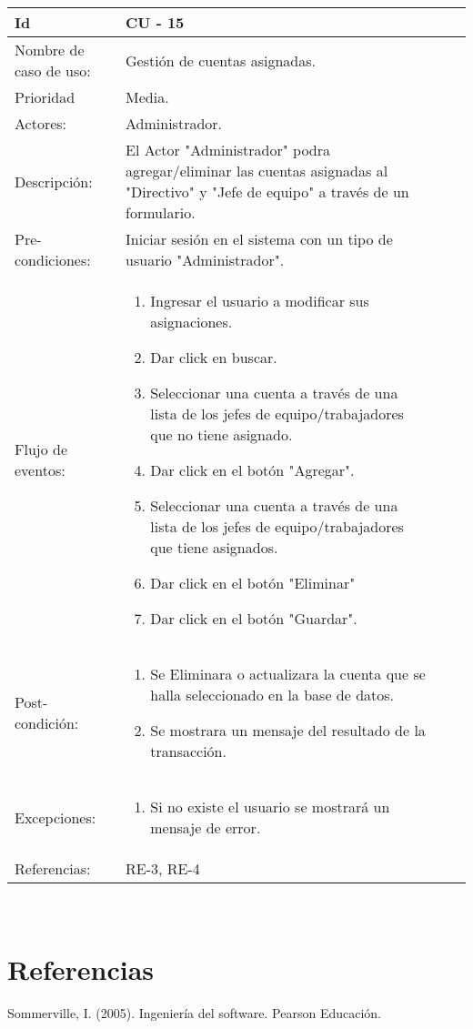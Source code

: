 \documentclass[11pt,a4paper]{article}
\begin{document}
\begin{tabular}[c]{|p{3cm}|p{13cm}|p{2.5cm}|p{3cm}|}
\hline 
\rule[-1ex]{0pt}{2.5ex} Id & CU - 15 \\ 
\hline 
\rule[-1ex]{0pt}{2.5ex} Nombre de caso de uso: & Gestión de cuentas asignadas.\\ 
\hline 
\rule[-1ex]{0pt}{2.5ex} Prioridad & Media. \\ 
\hline 
\rule[-1ex]{0pt}{2.5ex} Actores: & Administrador. \\ 
\hline 
\rule[-1ex]{0pt}{2.5ex} Descripción: & El Actor "Administrador" podra agregar/eliminar las cuentas asignadas al "Directivo" y "Jefe de equipo" a través de un formulario. \\ 
\hline 
\rule[-1ex]{0pt}{2.5ex} Pre-condiciones: & Iniciar sesión en el sistema con un tipo de usuario "Administrador". \\ 
\hline 
\rule[-1ex]{0pt}{2.5ex} Flujo de eventos: & \begin{enumerate}
\item Ingresar el usuario a modificar sus asignaciones.
\item Dar click en buscar.
\item Seleccionar una cuenta a través de una lista de los jefes de equipo/trabajadores que no tiene asignado.
\item Dar click en el botón "Agregar".
\item Seleccionar una cuenta a través de una lista de los jefes de equipo/trabajadores que tiene asignados.
\item Dar click en el botón "Eliminar"
\item Dar click en el botón "Guardar".
\end{enumerate} \\ 
\hline 
\rule[-1ex]{0pt}{2.5ex} Post-condición: & \begin{enumerate}
\item Se Eliminara o actualizara la cuenta que se halla seleccionado en la base de datos.
\item Se mostrara un mensaje del resultado de la transacción.
\end{enumerate} \\ 
\hline 
\rule[-1ex]{0pt}{2.5ex} Excepciones: & \begin{enumerate}
\item Si no existe el usuario se mostrará un mensaje de error.
\end{enumerate} \\ 
\hline 
\rule[-1ex]{0pt}{2.5ex} Referencias: & RE-3, RE-4\\ 
\hline 
\end{tabular} 
\\

\cleardoublepage




\section{Referencias}
Sommerville, I. (2005). Ingeniería del software. Pearson Educación.
\end{document}
